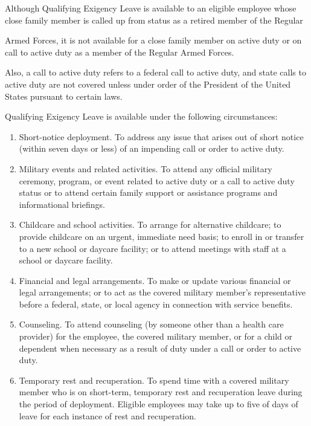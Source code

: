 Although Qualifying Exigency Leave is available to an eligible employee whose close family member is called up from status as a retired member of the Regular

Armed Forces, it is not available for a close family member on active duty or on call to active duty as a member of the Regular Armed Forces.

Also, a call to active duty refers to a federal call to active duty, and state calls to active duty are not covered unless under order of the President of the United States pursuant to certain laws.

Qualifying Exigency Leave is available under the following circumstances:

\begin{enumerate} 	\item Short-notice deployment. To address any 	issue that arises out of short notice (within seven 	days or less) of an impending call or order to 	active duty.
	
	\item Military events and related activities. To 	attend any official military ceremony, program, 	or event related to active duty or a call to active 	duty status or to attend certain family support or 	assistance programs and informational briefings.
	
	\item Childcare and school activities. To arrange 	for alternative childcare; to provide childcare on 	an urgent, immediate need basis; to enroll in or 	transfer to a new school or daycare facility; or to 	attend meetings with staff at a school or daycare 	facility.
	
	\item Financial and legal arrangements. To make 	or update various financial or legal 	arrangements; or to act as the covered military 	member's representative before a federal, state, 	or local agency in connection with service 	benefits.
	
	\item Counseling. To attend counseling (by 	someone other than a health care provider) for 	the employee, the covered military member, or 	for a child or dependent when necessary as a 	result of duty under a call or order to active duty.
	
	\item Temporary rest and recuperation. To spend 	time with a covered military member who is on 	short-term, temporary rest and recuperation 	leave during the period of deployment. Eligible 	employees may take up to five of days of leave 	for each instance of rest and recuperation.
	

\end{enumerate}
